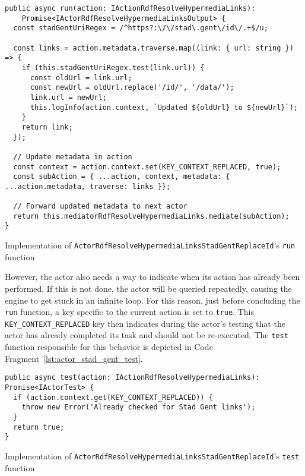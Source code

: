 \begin{listing}[htbp]
    \begin{verbatim}
public async run(action: IActionRdfResolveHypermediaLinks):
    Promise<IActorRdfResolveHypermediaLinksOutput> {
  const stadGentUriRegex = /^https?:\/\/stad\.gent\/id\/.+$/u;
  
  const links = action.metadata.traverse.map((link: { url: string }) => {
    if (this.stadGentUriRegex.test(link.url)) {
      const oldUrl = link.url;
      const newUrl = oldUrl.replace('/id/', '/data/');
      link.url = newUrl;
      this.logInfo(action.context, `Updated ${oldUrl} to ${newUrl}`);
    }
    return link;
  });
  
  // Update metadata in action
  const context = action.context.set(KEY_CONTEXT_REPLACED, true);
  const subAction = { ...action, context, metadata: { ...action.metadata, traverse: links }};
  
  // Forward updated metadata to next actor
  return this.mediatorRdfResolveHypermediaLinks.mediate(subAction);
}
    \end{verbatim}
    \caption{Implementation of \texttt{ActorRdfResolveHypermediaLinksStadGentReplaceId}'s \texttt{run} function}
    \label{lst:actor_stad_gent_run}
\end{listing}

However, the actor also needs a way to indicate when its action has already been performed. If this is not done, the actor will be queried repeatedly, causing the engine to get stuck in an infinite loop. For this reason, just before concluding the \texttt{run} function, a key specific to the current action is set to \texttt{true}. This \texttt{KEY_CONTEXT_REPLACED} key then indicates during the actor's testing that the actor has already completed its task and should not be re-executed. The \texttt{test} function responsible for this behavior is depicted in Code Fragment~\ref{lst:actor_stad_gent_test}.

\begin{listing}[htbp]
    \begin{verbatim}
public async test(action: IActionRdfResolveHypermediaLinks): Promise<IActorTest> {
  if (action.context.get(KEY_CONTEXT_REPLACED)) {
    throw new Error('Already checked for Stad Gent links');
  }
  return true;
}
    \end{verbatim}
    \caption{Implementation of \texttt{ActorRdfResolveHypermediaLinksStadGentReplaceId}'s \texttt{test} function}
    \label{lst:actor_stad_gent_test}
\end{listing}

